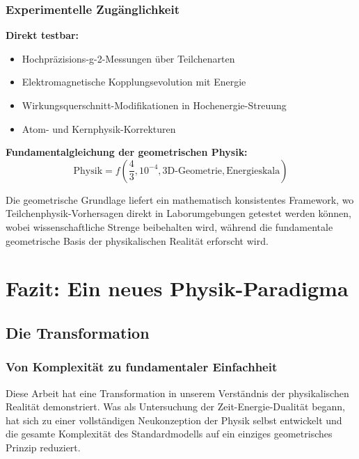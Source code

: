 \documentclass[12pt,a4paper]{report}
\begin{document}
	\subsection{Experimentelle Zugänglichkeit}
	\label{subsec:experimental_accessibility}
	
	\textbf{Direkt testbar:}
	\begin{itemize}
		\item Hochpräzisions-g-2-Messungen über Teilchenarten
		\item Elektromagnetische Kopplungsevolution mit Energie
		\item Wirkungsquerschnitt-Modifikationen in Hochenergie-Streuung
		\item Atom- und Kernphysik-Korrekturen
	\end{itemize}
	
	\textbf{Fundamentalgleichung der geometrischen Physik:}
	\begin{equation}
		\boxed{\text{Physik} = f\left(\frac{4}{3}, 10^{-4}, \text{3D-Geometrie}, \text{Energieskala}\right)}
	\end{equation}
	
	Die geometrische Grundlage liefert ein mathematisch konsistentes Framework, wo Teilchenphysik-Vorhersagen direkt in Laborumgebungen getestet werden können, wobei wissenschaftliche Strenge beibehalten wird, während die fundamentale geometrische Basis der physikalischen Realität erforscht wird.
	
	\chapter{Fazit: Ein neues Physik-Paradigma}
	\label{chap:conclusion}
	
	\section{Die Transformation}
	\label{sec:revolutionary_transformation}
	
	\subsection{Von Komplexität zu fundamentaler Einfachheit}
	\label{subsec:complexity_to_simplicity}
	
	Diese Arbeit hat eine Transformation in unserem Verständnis der physikalischen Realität demonstriert. Was als Untersuchung der Zeit-Energie-Dualität begann, hat sich zu einer vollständigen Neukonzeption der Physik selbst entwickelt und die gesamte Komplexität des Standardmodells auf ein einziges geometrisches Prinzip reduziert.
	
\end{document}
